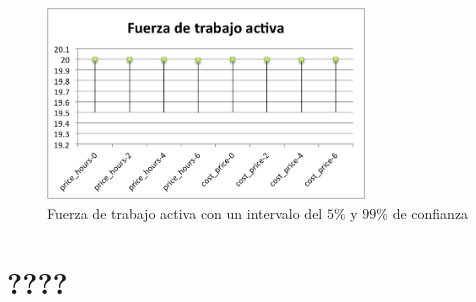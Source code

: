 \begin{figure}[H]

\begin{center}
    \includegraphics[width=0.75\textwidth,height=0.75\textheight,keepaspectratio]{./images/objetive-active-workforce.png}
\end{center}

\label{fig:objective-active-workforce}
\caption{Fuerza de trabajo activa con un intervalo del $5\%$ y $99\%$ de confianza}

\end{figure}

\section{????}

